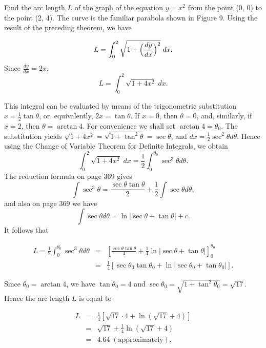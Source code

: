 \begin{example}
Find the arc length $L$ of the graph of the equation $y = x^2$ from the point (0, 0) to the point (2, 4). The curve is the familiar parabola shown in Figure 9. Using the result of the preceding theorem, we have

$$
L = \int_0^2 \sqrt{1 + \Bigl(\frac{dy}{dx}\Bigr)^2} \;dx .
$$
\noindent Since $\frac{dy}{dx} = 2x$,
$$
L = \int_0^2 \sqrt{1 + 4x^2} \;dx .
$$

\noindent This integral can be evaluated by means of the trigonometric substitution $x =  \frac{1}{2} \tan \theta$, or, equivalently, $2x = \tan \theta$. If $x = 0$, then $ \theta = 0$, and, similarly, if $x = 2$, then $ \theta = \arctan 4$. For convenience we shall set $\arctan 4 = \theta_0$. The substitution yields $ \sqrt{1 + 4x^2} = \sqrt{1 + \tan^2 \theta} = \sec \theta$, and $dx = \frac{1}{2} \sec^2 \theta d \theta$. Hence using the Change of Variable Theorem for Definite Integrals, we obtain
$$
\int_0^2 \sqrt{1 + 4x^2} \;dx = \frac{1}{2} \int_0^{\theta_0} \sec^3 \theta d\theta.
$$
\noindent The reduction formula on page 369 gives 
$$
\int \sec^3 \theta = \frac{\sec \theta \tan \theta}{2} + \frac{1}{2} \int \sec \theta d\theta , 
$$
\noindent and also on page 369 we have
$$
\int \sec \theta d\theta = \ln |\sec \theta + \tan \theta| + c.
$$
\noindent It follows that 

\begin{eqnarray*}
L = \frac{1}{2} \int_0^{\theta_0} \sec^3 \theta d\theta 
&=& \left[ \frac{\sec \theta \tan \theta}{4} + \frac{1}{4} \ln |\sec \theta + \tan \theta| \right]_0^{\theta_0} \\
&=& \frac{1}{4} [ \sec \theta_0 \tan \theta_0 + \ln |\sec \theta_0 + \tan \theta_0| ].
\end{eqnarray*}

\noindent Since $\theta_0 = \arctan 4$, we have $\tan \theta_0 = 4$ and $\sec \theta_0 = \sqrt{1 + \tan^2 \theta_0} = \sqrt{17}$.  Hence the arc length $L$ is equal to

\begin{eqnarray*}
L &=& \frac{1}{4}[\sqrt{17} \cdot 4 + \ln(\sqrt{17} + 4)] \\
   &=& \sqrt{17} + \frac{1}{4} \ln(\sqrt{17} + 4) \\
   &=& 4.64\;(\mathrm{approximately}).
\end{eqnarray*}
\end{example}

